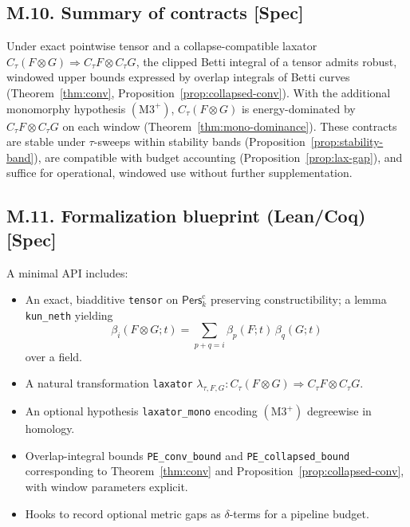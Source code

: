 \documentclass[11pt]{article}
\numberwithin{equation}{section}
\theoremstyle{plain}
\theoremstyle{definition}
\theoremstyle{remark}
\newcommand{\Pers}{\mathsf{Pers}}
\theoremstyle{plain}
\theoremstyle{definition}
\newcommand{\kk}{k}
\newcommand{\betti}{\beta}
\newcommand{\CT}{C_{\tau}}
\numberwithin{equation}{section}
\theoremstyle{definition}
\numberwithin{equation}{section}
\theoremstyle{plain}
\theoremstyle{definition}
\theoremstyle{remark}
\begin{document}
\bigskip

\subsection*{M.10. Summary of contracts [Spec]}

Under exact pointwise tensor and a collapse-compatible laxator \(\CT(F\otimes G)\Rightarrow \CT F\otimes \CT G\), the clipped Betti integral of a tensor admits robust, windowed upper bounds expressed by overlap integrals of Betti curves (Theorem~\ref{thm:conv}, Proposition~\ref{prop:collapsed-conv}). With the additional monomorphy hypothesis \((\mathrm{M3}^+)\), \(\CT(F\otimes G)\) is energy-dominated by \(\CT F\otimes \CT G\) on each window (Theorem~\ref{thm:mono-dominance}). These contracts are stable under \(\tau\)-sweeps within stability bands (Proposition~\ref{prop:stability-band}), are compatible with budget accounting (Proposition~\ref{prop:lax-gap}), and suffice for operational, windowed use without further supplementation.

\bigskip

\subsection*{M.11. Formalization blueprint (Lean/Coq) [Spec]}

A minimal API includes:
\begin{itemize}[leftmargin=2em]
  \item An exact, biadditive \texttt{tensor} on \(\Pers^\mathrm{c}_\kk\) preserving constructibility; a lemma \texttt{kun\_neth} yielding
  \[
    \betti_i(F\otimes G;t)=\sum_{p+q=i}\betti_p(F;t)\,\betti_q(G;t)
  \]
  over a field.
  \item A natural transformation \texttt{laxator} \(\lambda_{\tau,F,G}:\CT(F\otimes G)\Rightarrow \CT F\otimes \CT G\).
  \item An optional hypothesis \texttt{laxator\_mono} encoding \((\mathrm{M3}^+)\) degreewise in homology.
  \item Overlap-integral bounds \texttt{PE\_conv\_bound} and \texttt{PE\_collapsed\_bound} corresponding to Theorem~\ref{thm:conv} and Proposition~\ref{prop:collapsed-conv}, with window parameters explicit.
  \item Hooks to record optional metric gaps as \(\delta\)-terms for a pipeline budget.
\end{itemize}



\end{document}
